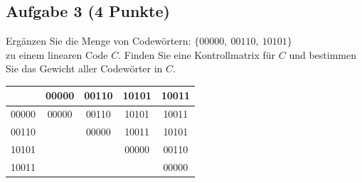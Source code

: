 \documentclass{article} %
\begin{document}
\subsection*{Aufgabe 3 (4 Punkte)}
Ergänzen Sie die Menge von Codewörtern: $\{00000, \ 00110, \ 10101\}$ \\
zu einem linearen Code $C$. Finden Sie eine Kontrollmatrix für $C$ und bestimmen Sie das Gewicht aller Codewörter in $C$.
\begin{mybox}

    \begin{tabular}{c|cccc}
        & 00000 & 00110 & 10101 & 10011\\ \hline
   00000& 00000 & 00110 & 10101 & 10011\\
   00110&       & 00000 & 10011 & 10101\\
   10101&       &       & 00000 & 00110\\
   10011&       &       &       & 00000
    \end{tabular}
\end{mybox}
\end{document}
